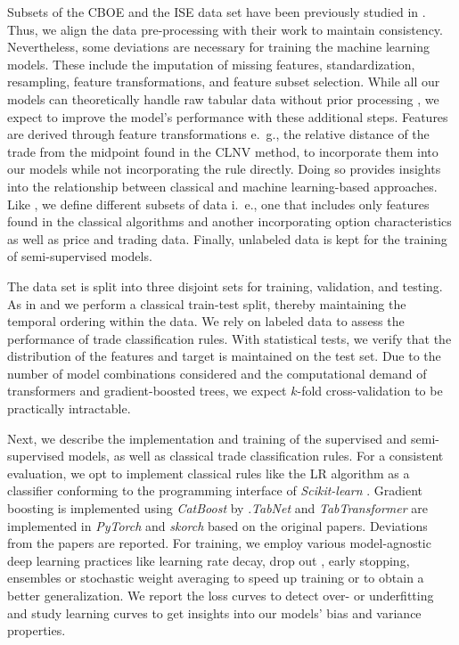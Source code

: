 Subsets of the \gls{CBOE} and the \gls{ISE} data set have been previously studied in \textcite{grauerOptionTradeClassification2022}. Thus, we align the data pre-processing with their work to maintain consistency. Nevertheless, some deviations are necessary for training the machine learning models. These include the imputation of missing features, standardization, resampling, feature transformations, and feature subset selection. While all our models can theoretically handle raw tabular data without prior processing \autocites{arikTabNetAttentiveInterpretable2020}{prokhorenkovaCatBoostUnbiasedBoosting2018}{huangTabTransformerTabularData2020}, we expect to improve the model's performance with these additional steps. Features are derived through feature transformations e.~g., the relative distance of the trade from the midpoint found in the \gls{CLNV} method, to incorporate them into our models while not incorporating the rule directly. Doing so provides insights into the relationship between classical and machine learning-based approaches. Like \textcite{ronenMachineLearningTrade2022}, we define different subsets of data i.~e., one that includes only features found in the classical algorithms and another incorporating option characteristics as well as price and trading data. Finally, unlabeled data is kept for the training of semi-supervised models.

The data set is split into three disjoint sets for training, validation, and testing. As in \textcite{ellisAccuracyTradeClassification2000} and \textcite{ronenMachineLearningTrade2022} we perform a classical train-test split, thereby maintaining the temporal ordering within the data. We rely on labeled data to assess the performance of trade classification rules. With statistical tests, we verify that the distribution of the features and target is maintained on the test set. Due to the number of model combinations considered and the computational demand of transformers and gradient-boosted trees, we expect $k$-fold cross-validation to be practically intractable.

Next, we describe the implementation and training of the supervised and semi-supervised models, as well as classical trade classification rules. 
For a consistent evaluation, we opt to implement classical rules like the \gls{LR} algorithm as a classifier conforming to the programming interface of \emph{Scikit-learn} \autocite{pedregosaScikitlearnMachineLearning2018}.
Gradient boosting is implemented using \emph{CatBoost} by \textcite{prokhorenkovaCatBoostUnbiasedBoosting2018}.\emph{TabNet} and \emph{TabTransformer} are implemented in \emph{PyTorch} \autocite{paszkePyTorchImperativeStyle2019} and \emph{skorch} based on the original papers. Deviations from the papers are reported.
For training, we employ various model-agnostic deep learning practices like learning rate decay, drop out \autocite{hintonImprovingNeuralNetworks2012}, early stopping, ensembles \autocite{huangSnapshotEnsemblesTrain2017} or stochastic weight averaging \autocite{izmailovAveragingWeightsLeads2019} to speed up training or to obtain a better generalization. We report the loss curves to detect over- or underfitting and study learning curves to get insights into our models' bias and variance properties.  

